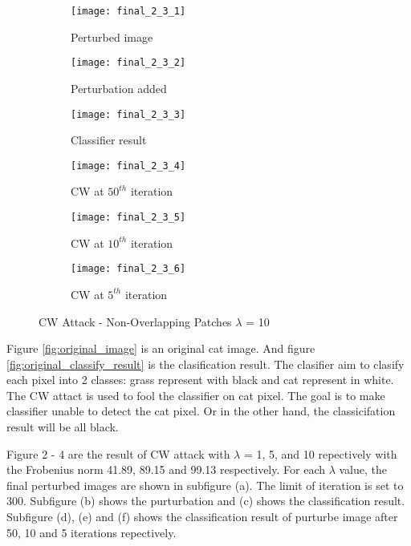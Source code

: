 \documentclass[11pt]{article}
\begin{document}
\begin{figure}[H]
\begin{subfigure}{.3\textwidth}
  \centering
  \texttt{[image: final\_2\_3\_1]}
  \caption{Perturbed image}
  \label{fig:}
\end{subfigure}
\begin{subfigure}{.3\textwidth}
  \centering
  \texttt{[image: final\_2\_3\_2]}
  \caption{Perturbation added}
  \label{fig:}
\end{subfigure}
\begin{subfigure}{.3\textwidth}
  \centering
  \texttt{[image: final\_2\_3\_3]}
  \caption{Classifier result}
  \label{fig:}
\end{subfigure}

\begin{subfigure}{.3\textwidth}
  \centering
  \texttt{[image: final\_2\_3\_4]}
  \caption{CW at $50^{th}$ iteration}
  \label{fig:}
\end{subfigure}
\begin{subfigure}{.3\textwidth}
  \centering
  \texttt{[image: final\_2\_3\_5]}
  \caption{CW at $10^{th}$ iteration}
  \label{fig:}
\end{subfigure}
\begin{subfigure}{.3\textwidth}
  \centering
  \texttt{[image: final\_2\_3\_6]}
  \caption{CW at $5^{th}$ iteration}
  \label{fig:}
\end{subfigure}

\caption{CW Attack - Non-Overlapping Patches $\lambda$ = 10}
\label{fig:}
\end{figure}

Figure \ref{fig:original_image} is an original cat image. And figure \ref{fig:original_classify_result} is the clasification result.
The clasifier aim to clasify each pixel into 2 classes: grass represent with black and cat represent in white. 
The CW attact is used to fool the classifier on cat pixel. The goal is to make classifier unable to detect the cat pixel. Or in the other hand, the classicifation result will be all black. 

Figure 2 - 4 are the result of CW attack with $\lambda$ = 1, 5, and 10 repectively with the Frobenius norm 41.89, 89.15 and 99.13 respectively. For each $\lambda$ value, the final perturbed images are shown in subfigure (a). The limit of iteration is set to 300. Subfigure (b) shows the purturbation and (c) shows the classification result. Subfigure (d), (e) and (f) shows the classification result of purturbe image after 50, 10 and 5 iterations repectively.
\end{document}
